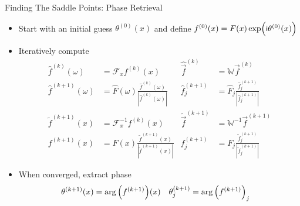 \begin{frame}{Finding The Saddle Points: Phase Retrieval}
%
\begin{itemize}
\item Start with an initial guess $\theta^{(0)}(x)$ and define $f^{(0)}(x) = F(x) \exp(\Big.\mathsf{i} \theta^{(0)}(x))$
\item Iteratively compute
	\begin{align*}
		\hat{f}^{(k)}(\omega) &= \mathcal{F}_x f^{(k)}(x)
	&
		\hat{\vec{f}}^{(k)} &= \mathbb{W} \vec{f}^{(k)}
\\
		\hat{f}^{(k + 1)}(\omega)
	&=
		\hat{F}(\omega)
		\frac
			{ \hat{f}^{(k)}(\omega) }
			{|\hat{f}^{(k)}(\omega)|}
	&
		\hat{f}^{(k + 1)}_j
	&=
		\hat{F}_j
		\frac
			{ \hat{f}^{(k + 1)}_j }
			{|\hat{f}^{(k + 1)}_j|}
\\
		\tilde{f}^{(k + 1)}(x) &= \mathcal{F}^{-1}_x  f^{(k)}(x)
	&
		\tilde{\vec{f}}^{(k + 1)} &= \mathbb{W}^{-1} \vec{f}^{(k + 1)}
\\
		f^{(k + 1)}(x)
	&=
		F(x)
		\frac
			{ \tilde{f}^{(k + 1)}(x) }
			{|\tilde{f}^{(k + 1)}(x)|}
	&
		f^{(k + 1)}_j
	&=
		F_j
		\frac
			{ \tilde{f}^{(k + 1)}_j }
			{|\tilde{f}^{(k + 1)}_j|}
	\end{align*}
\item When converged, extract phase
	\begin{align*}
		\theta^{(k + 1)}(x) &= \arg\qty(f^{(k + 1)})(x)
	&
		\theta^{(k + 1)}_j &= \arg\qty(f^{(k + 1)})_j
	\end{align*}
\end{itemize}
%
\end{frame}


